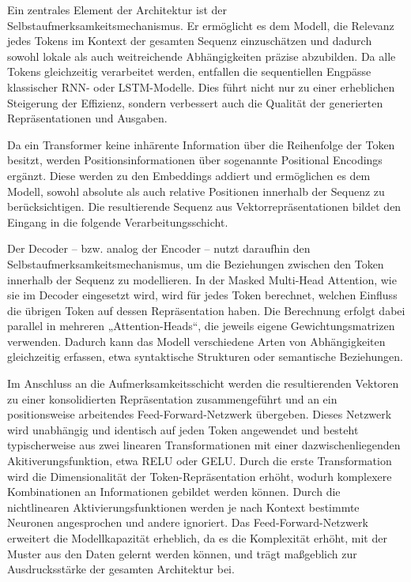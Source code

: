 Ein zentrales Element der Architektur ist der Selbstaufmerksamkeitsmechanismus. Er ermöglicht es dem Modell, die Relevanz jedes Tokens im Kontext der gesamten Sequenz einzuschätzen und dadurch sowohl lokale als auch weitreichende Abhängigkeiten präzise abzubilden. Da alle Tokens gleichzeitig verarbeitet werden, entfallen die sequentiellen Engpässe klassischer RNN- oder LSTM-Modelle. Dies führt nicht nur zu einer erheblichen Steigerung der Effizienz, sondern verbessert auch die Qualität der generierten Repräsentationen und Ausgaben.

Da ein Transformer keine inhärente Information über die Reihenfolge der Token besitzt, werden Positionsinformationen über sogenannte Positional Encodings ergänzt. Diese werden zu den Embeddings addiert und ermöglichen es dem Modell, sowohl absolute als auch relative Positionen innerhalb der Sequenz zu berücksichtigen. Die resultierende Sequenz aus Vektorrepräsentationen bildet den Eingang in die folgende Verarbeitungsschicht.

Der Decoder – bzw. analog der Encoder – nutzt daraufhin den Selbstaufmerksamkeitsmechanismus, um die Beziehungen zwischen den Token innerhalb der Sequenz zu modellieren. In der Masked Multi-Head Attention, wie sie im Decoder eingesetzt wird, wird für jedes Token berechnet, welchen Einfluss die übrigen Token auf dessen Repräsentation haben. Die Berechnung erfolgt dabei parallel in mehreren „Attention-Heads“, die jeweils eigene Gewichtungsmatrizen verwenden. Dadurch kann das Modell verschiedene Arten von Abhängigkeiten gleichzeitig erfassen, etwa syntaktische Strukturen oder semantische Beziehungen.

Im Anschluss an die Aufmerksamkeitsschicht werden die resultierenden Vektoren zu einer konsolidierten Repräsentation zusammengeführt und an ein positionsweise arbeitendes Feed-Forward-Netzwerk übergeben. Dieses Netzwerk wird unabhängig und identisch auf jeden Token angewendet und besteht typischerweise aus zwei linearen Transformationen mit einer dazwischenliegenden Akitiverungsfunktion, etwa RELU oder GELU. Durch die erste Transformation wird die Dimensionalität  der Token-Repräsentation erhöht, wodurh komplexere Kombinationen an Informationen gebildet werden können. Durch die nichtlinearen Aktivierungsfunktionen werden je nach Kontext bestimmte Neuronen angesprochen und andere ignoriert.
Das Feed-Forward-Netzwerk erweitert die Modellkapazität erheblich, da es die Komplexität erhöht, mit der Muster aus den Daten gelernt werden können, und trägt maßgeblich zur Ausdrucksstärke der gesamten Architektur bei.

